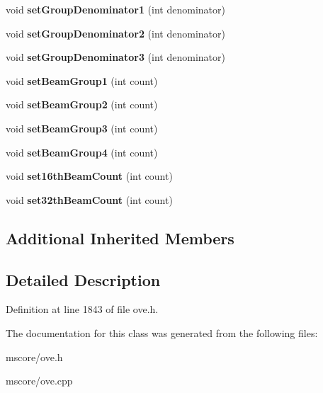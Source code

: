 \begin{DoxyCompactItemize}
\item 
\mbox{\label{class_o_v_e_1_1_time_signature_a5254d1c31425682416c4b36905f3f4b1}} 
void {\bfseries set\+Group\+Denominator1} (int denominator)
\item 
\mbox{\label{class_o_v_e_1_1_time_signature_a9992e085433478fb72213434b962bbeb}} 
void {\bfseries set\+Group\+Denominator2} (int denominator)
\item 
\mbox{\label{class_o_v_e_1_1_time_signature_a3e958a467f69da3d0dc3b36b0ec8eb55}} 
void {\bfseries set\+Group\+Denominator3} (int denominator)
\item 
\mbox{\label{class_o_v_e_1_1_time_signature_af717c33f87db7d8080979adaea1bffe6}} 
void {\bfseries set\+Beam\+Group1} (int count)
\item 
\mbox{\label{class_o_v_e_1_1_time_signature_a815501d5e65092f85594db331f983585}} 
void {\bfseries set\+Beam\+Group2} (int count)
\item 
\mbox{\label{class_o_v_e_1_1_time_signature_a88b5a7b4cdc06a414b0aebf09a4efebb}} 
void {\bfseries set\+Beam\+Group3} (int count)
\item 
\mbox{\label{class_o_v_e_1_1_time_signature_a982a911ef0750612145c432b87cad9be}} 
void {\bfseries set\+Beam\+Group4} (int count)
\item 
\mbox{\label{class_o_v_e_1_1_time_signature_a3613aa98d068cf68db3a7fb1bc9aa476}} 
void {\bfseries set16th\+Beam\+Count} (int count)
\item 
\mbox{\label{class_o_v_e_1_1_time_signature_aa9570c3cc6faad4e828fd58d9d7c15a8}} 
void {\bfseries set32th\+Beam\+Count} (int count)
\end{DoxyCompactItemize}
\subsection*{Additional Inherited Members}


\subsection{Detailed Description}


Definition at line 1843 of file ove.\+h.



The documentation for this class was generated from the following files\+:\begin{DoxyCompactItemize}
\item 
mscore/ove.\+h\item 
mscore/ove.\+cpp\end{DoxyCompactItemize}
